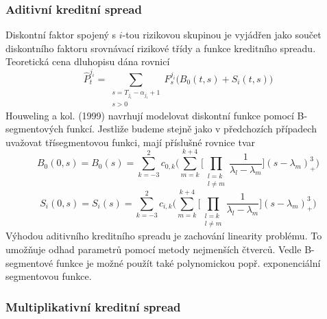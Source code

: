 \documentclass[a4paper]{book}
\begin{document}
\subsubsection{Aditivní kreditní spread}

Diskontní faktor spojený s $i$-tou rizikovou skupinou je vyjádřen jako součet diskontního faktoru srovnávací rizikové třídy a funkce kreditního spreadu. Teoretická cena dluhopisu dána rovnicí
\begin{equation*}
\hat{P}_t^{j_i} = \sum_{\substack{s = T_{j_i} - \alpha_{j_i} + 1 \\ s > 0}}F_s^{j_i} \Big( B_0(t,s) + S_i(t,s)\Big)
\end{equation*}
Houweling a kol. (1999) navrhují modelovat diskontní funkce pomocí B-segmentových funkcí. Jestliže budeme stejně jako v předchozích případech uvažovat třísegmentovou funkci, mají příslušné rovnice tvar
\begin{equation*}
B_0(0,s) = B_0(s) = \sum_{k=-3}^2 c_{0,k}\Bigg( \sum_{m=k}^{k+4}\Bigg[ \prod_{\substack{l = k \\ l \neq m}} \frac{1}{\lambda_l - \lambda_m}\Bigg](s - \lambda_m)_{+}^3 \Bigg)
\end{equation*}
\begin{equation*}
S_i(0,s) = S_i(s) = \sum_{k=-3}^2 c_{i,k}\Bigg( \sum_{m=k}^{k+4}\Bigg[ \prod_{\substack{l = k \\ l \neq m}} \frac{1}{\lambda_l - \lambda_m}\Bigg](s - \lambda_m)_{+}^3 \Bigg)
\end{equation*}
Výhodou aditivního kreditního spreadu je zachování linearity problému. To umožňuje odhad parametrů pomocí metody nejmenších čtverců. Vedle B-segmentové funkce je možné použít také polynomickou popř. exponenciální segmentovou funkce.

\subsubsection{Multiplikativní kreditní spread}
\end{document}
